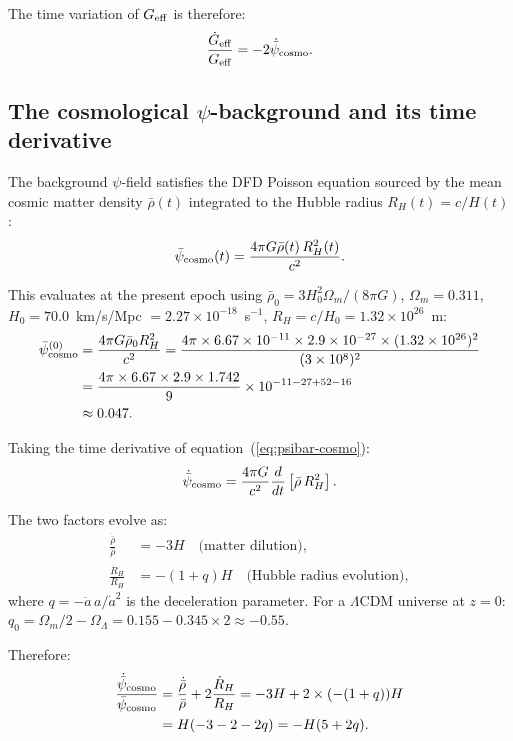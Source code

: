 \documentclass[aps,prd,twocolumn,superscriptaddress,nofootinbib,longbibliography]{revtex4-2}
\newcommand{\psibar}{\bar{\psi}}
\newcommand{\ee}[1]{\times 10^{#1}}
\begin{document}
The time variation of $G_{\rm eff}$ is therefore:
\begin{equation}
\frac{\dot{G}_{\rm eff}}{G_{\rm eff}} = -2\dot{\psibar}_{\rm cosmo}.
\label{eq:Gdot-psibar}
\end{equation}

\subsection{The cosmological $\psi$-background and its time derivative}

The background $\psi$-field satisfies the DFD Poisson equation sourced by
the mean cosmic matter density $\bar{\rho}(t)$ integrated to the Hubble
radius $R_H(t) = c/H(t)$:
\begin{equation}
\psibar_{\rm cosmo}(t) = \frac{4\pi G\bar{\rho}(t)\,R_H^2(t)}{c^2}.
\label{eq:psibar-cosmo}
\end{equation}

This evaluates at the present epoch using $\bar{\rho}_0 = 3H_0^2\Omega_m/(8\pi G)$,
$\Omega_m = 0.311$, $H_0 = 70.0$~km/s/Mpc $= 2.27\ee{-18}$~s$^{-1}$,
$R_H = c/H_0 = 1.32\ee{26}$~m:
\begin{align}
\psibar_{\rm cosmo}^{(0)} &= \frac{4\pi G\bar{\rho}_0 R_H^2}{c^2}
= \frac{4\pi\times 6.67\ee{-11}\times 2.9\ee{-27}\times(1.32\ee{26})^2}
{(3\ee{8})^2}\nonumber\\
&= \frac{4\pi\times 6.67\times 2.9\times 1.742}
{9}\ee{-11-27+52-16}\nonumber\\
&\approx 0.047.
\label{eq:psibar-num}
\end{align}

Taking the time derivative of equation~(\ref{eq:psibar-cosmo}):
\begin{equation}
\dot{\psibar}_{\rm cosmo} = \frac{4\pi G}{c^2}
\frac{d}{dt}\left[\bar{\rho}\,R_H^2\right].
\label{eq:psibar-dot-raw}
\end{equation}

The two factors evolve as:
\begin{align}
\frac{\dot{\bar{\rho}}}{\bar{\rho}} &= -3H \quad\text{(matter dilution)},\\
\frac{\dot{R}_H}{R_H} &= -(1+q)H \quad\text{(Hubble radius evolution)},
\end{align}
where $q = -\ddot{a}\,a/\dot{a}^2$ is the deceleration parameter.
For a $\Lambda$CDM universe at $z=0$:
$q_0 = \Omega_m/2 - \Omega_\Lambda = 0.155 - 0.345 \times 2 \approx -0.55$.

Therefore:
\begin{align}
\frac{\dot{\psibar}_{\rm cosmo}}{\psibar_{\rm cosmo}}
&= \frac{\dot{\bar{\rho}}}{\bar{\rho}} + 2\frac{\dot{R}_H}{R_H}
= -3H + 2\times(-(1+q))H\nonumber\\
&= H(-3 - 2 - 2q) = -H(5 + 2q).
\label{eq:psibar-dot-ratio}
\end{align}
\end{document}
